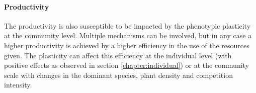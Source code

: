 
\paragraph{Productivity}

The productivity is also susceptible to be impacted by the phenotypic plasticity at the community level. Multiple mechanisms can be involved, but in any case a higher productivity is achieved by a higher efficiency in the use of the resources given. The plasticity can affect this efficiency at the individual level (with positive effects as observed in section \ref{chapter:individual}) or at the community scale with changes in the dominant species, plant density and competition intensity.

